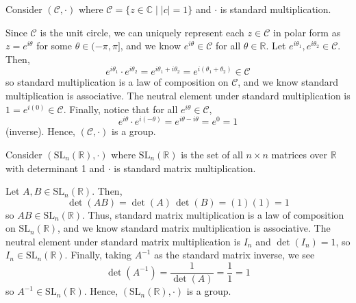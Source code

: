 \begin{exer}
Consider $ (\mathcal{C},\cdot) $ where $ \mathcal{C}=\{z\in\mathbb{C}\mid\lvert c\rvert=1\} $ and $ \cdot $ is standard multiplication.
\end{exer}
\begin{sltn}
Since $ \mathcal{C} $ is the unit circle, we can uniquely represent each $ z\in\mathcal{C} $ in polar form as $ z=e^{i\theta} $ for some $ \theta\in(-\pi,\pi] $, and we know $ e^{i\theta}\in\mathcal{C} $ for all $ \theta\in\mathbb{R} $. Let $ e^{i\theta_1},e^{i\theta_2}\in\mathcal{C} $. Then,
\begin{equation*}
    e^{i\theta_1}\cdot e^{i\theta_2}=e^{i\theta_1+i\theta_2}=e^{i(\theta_1+\theta_2)}\in\mathcal{C}
\end{equation*}
so standard multiplication is a law of composition on $ \mathcal{C} $, and we know standard multiplication is associative. The neutral element under standard multiplication is $ 1=e^{i(0)}\in\mathcal{C} $. Finally, notice that for all $ e^{i\theta}\in\mathcal{C} $,
\begin{equation*}
    e^{i\theta}\cdot e^{i(-\theta)}=e^{i\theta-i\theta}=e^0=1
\end{equation*}
(inverse). Hence, $ (\mathcal{C},\cdot) $ is a group.
\end{sltn}

\begin{exer}
Consider $ (\mathrm{SL}_n(\mathbb{R}),\cdot) $ where $ \mathrm{SL}_n(\mathbb{R}) $ is the set of all $ n\times n $ matrices over $ \mathbb{R} $ with determinant 1 and $ \cdot $ is standard matrix multiplication.
\end{exer}
\begin{sltn}
Let $ A,B\in\mathrm{SL}_n(\mathbb{R}) $. Then,
\begin{equation*}
    \det(AB)=\det(A)\,\det(B)=(1)(1)=1
\end{equation*}
so $ AB\in\mathrm{SL}_n(\mathbb{R}) $. Thus, standard matrix multiplication is a law of composition on $ \mathrm{SL}_n(\mathbb{R}) $, and we know standard matrix multiplication is associative. The neutral element under standard matrix multiplication is $ I_n $ and $ \det(I_n)=1 $, so $ I_n\in\mathrm{SL}_n(\mathbb{R}) $. Finally, taking $ A^{-1} $ as the standard matrix inverse, we see
\begin{equation*}
    \det(A^{-1})=\frac{1}{\det(A)}=\frac{1}{1}=1
\end{equation*}
so $ A^{-1}\in\mathrm{SL}_n(\mathbb{R}) $. Hence, $ (\mathrm{SL}_n(\mathbb{R}),\cdot) $ is a group.
\end{sltn}

